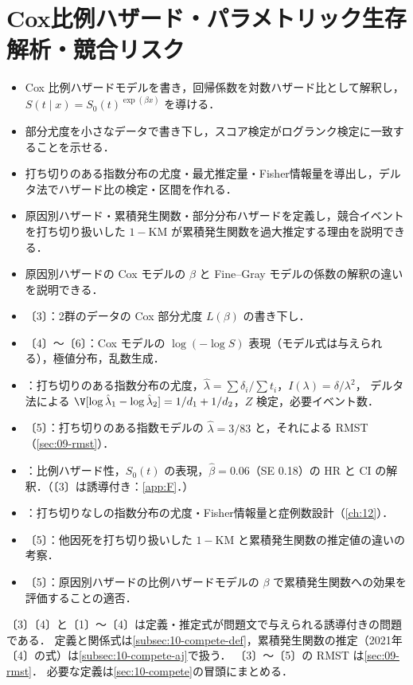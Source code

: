 \chapter[Cox比例ハザード・パラメトリック生存解析・競合リスク]{Cox比例ハザード・パラメトリック生存解析・競合リスク}\label{ch:10}

\begin{goalbox}
\begin{itemize}
\item Cox 比例ハザードモデルを書き，回帰係数を対数ハザード比として解釈し，$S(t\mid x)=S_0(t)^{\exp(\beta x)}$ を導ける．
\item 部分尤度を小さなデータで書き下し，スコア検定がログランク検定に一致することを示せる．
\item 打ち切りのある指数分布の尤度・最尤推定量・Fisher情報量を導出し，デルタ法でハザード比の検定・区間を作れる．
\item 原因別ハザード・累積発生関数・部分分布ハザードを定義し，競合イベントを打ち切り扱いした $1-\mathrm{KM}$ が累積発生関数を過大推定する理由を説明できる．
\item 原因別ハザードの Cox モデルの $\beta$ と Fine--Gray モデルの係数の解釈の違いを説明できる．
\end{itemize}
\end{goalbox}

\begin{exambox}
\begin{itemize}
\item {}〔3〕：2群のデータの Cox 部分尤度 $L(\beta)$ の書き下し．
\item {}〔4〕〜〔6〕：Cox モデルの $\log(-\log S)$ 表現（モデル式は与えられる），極値分布，乱数生成．
\item {}：打ち切りのある指数分布の尤度，$\hat\lambda=\sum\delta_i/\sum t_i$，$I(\lambda)=\delta/\lambda^2$，
      デルタ法による $\V[\log\hat\lambda_1-\log\hat\lambda_2]=1/d_1+1/d_2$，$Z$ 検定，必要イベント数．
\item {}〔5〕：打ち切りのある指数モデルの $\hat\lambda=3/83$ と，それによる RMST（\cref{sec:09-rmst}）．
\item {}：比例ハザード性，$S_0(t)$ の表現，$\hat\beta=0.06$（SE 0.18）の HR と CI の解釈．（〔3〕は誘導付き：\cref{app:F}．）
\item {}：打ち切りなしの指数分布の尤度・Fisher情報量と症例数設計（\cref{ch:12}）．
\item {}〔5〕：他因死を打ち切り扱いした $1-\mathrm{KM}$ と累積発生関数の推定値の違いの考察．
\item {}〔5〕：原因別ハザードの比例ハザードモデルの $\beta$ で累積発生関数への効果を評価することの適否．
\end{itemize}
〔3〕〔4〕と〔1〕〜〔4〕は定義・推定式が問題文で与えられる誘導付きの問題である．
定義と関係式は\cref{subsec:10-compete-def}，累積発生関数の推定（2021年〔4〕の式）は\cref{subsec:10-compete-aj}で扱う．
〔3〕〜〔5〕の RMST は\cref{sec:09-rmst}．
必要な定義は\cref{sec:10-compete}の冒頭にまとめる．
\end{exambox}

